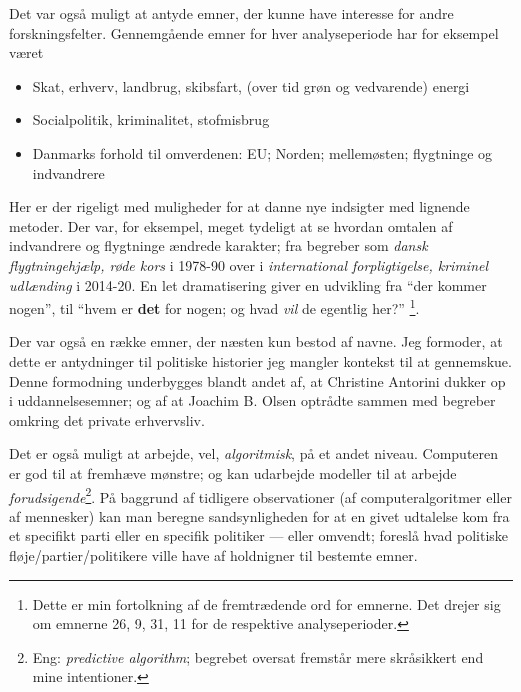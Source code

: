 Det var også muligt at antyde emner, der kunne have interesse for andre forskningsfelter.
Gennemgående emner for hver analyseperiode har for eksempel været
\begin{itemize}
  \item
    Skat, erhverv, landbrug, skibsfart, (over tid grøn og vedvarende) energi
  \item
    Socialpolitik, kriminalitet, stofmisbrug
  \item
    Danmarks forhold til omverdenen: EU; Norden; mellemøsten; flygtninge og indvandrere
\end{itemize}
Her er der rigeligt med muligheder for at danne nye indsigter med lignende metoder.
Der var, for eksempel, meget tydeligt at se hvordan omtalen af indvandrere og flygtninge ændrede karakter;
fra begreber som \textit{dansk flygtningehjælp, røde kors} i 1978-90 over i \textit{international forpligtigelse, kriminel udlænding} i 2014-20.
En let dramatisering giver en udvikling fra “der kommer nogen”, til “hvem er \textbf{det} for nogen; og hvad \textit{vil} de egentlig her?”
\footnote{Dette er min fortolkning af de fremtrædende ord for emnerne. Det drejer sig om emnerne 26, 9, 31, 11 for de respektive analyseperioder.}.

Der var også en række emner, der næsten kun bestod af navne.
Jeg formoder, at dette er antydninger til politiske historier jeg mangler kontekst til at gennemskue.
Denne formodning underbygges blandt andet af, at Christine Antorini dukker op i uddannelsesemner; og af at Joachim B. Olsen optrådte sammen med begreber omkring det private erhvervsliv.

Det er også muligt at arbejde, vel, \textit{algoritmisk}, på et andet niveau.
Computeren er god til at fremhæve mønstre;
og kan udarbejde modeller til at arbejde \textit{forudsigende}\footnote{Eng: \textit{predictive algorithm}; begrebet oversat fremstår mere skråsikkert end mine intentioner.}.
På baggrund af tidligere observationer
(af computeralgoritmer eller af mennesker)
kan man beregne sandsynligheden for at en givet udtalelse kom fra et specifikt parti eller en specifik politiker —
eller omvendt; foreslå hvad politiske fløje/partier/politikere ville have af holdnigner til bestemte emner.

